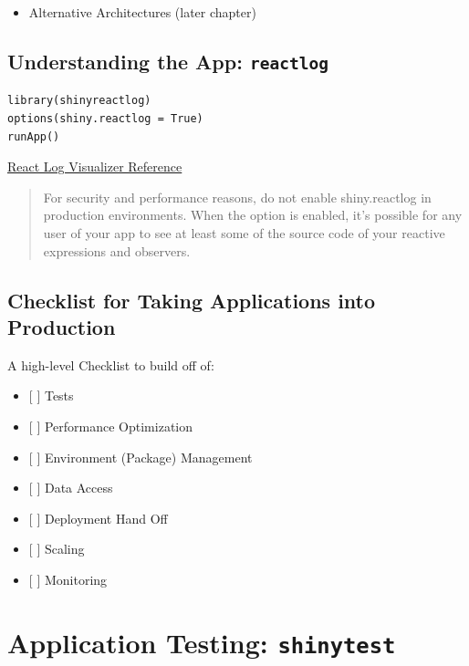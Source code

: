 \documentclass[]{book}
\providecommand{\tightlist}{%
  \setlength{\itemsep}{0pt}\setlength{\parskip}{0pt}}
\begin{document}
\begin{itemize}
\tightlist
\item
  Alternative Architectures (later chapter)
\end{itemize}

\hypertarget{understanding-the-app-reactlog}{%
\section{\texorpdfstring{Understanding the App:
\texttt{reactlog}}{Understanding the App: reactlog}}\label{understanding-the-app-reactlog}}

\begin{verbatim}
library(shinyreactlog)
options(shiny.reactlog = True)
runApp()
\end{verbatim}

\href{https://shiny.rstudio.com/reference/shiny/0.14/showReactLog.html}{React
Log Visualizer Reference}

\begin{quote}
For security and performance reasons, do not enable shiny.reactlog in
production environments. When the option is enabled, it's possible for
any user of your app to see at least some of the source code of your
reactive expressions and observers.
\end{quote}

\hypertarget{checklist-for-taking-applications-into-production}{%
\section{Checklist for Taking Applications into
Production}\label{checklist-for-taking-applications-into-production}}

A high-level Checklist to build off of:

\begin{itemize}
\tightlist
\item
  {[} {]} Tests
\item
  {[} {]} Performance Optimization
\item
  {[} {]} Environment (Package) Management
\item
  {[} {]} Data Access
\item
  {[} {]} Deployment Hand Off
\item
  {[} {]} Scaling
\item
  {[} {]} Monitoring
\end{itemize}

\hypertarget{application-testing-shinytest}{%
\chapter{\texorpdfstring{Application Testing:
\texttt{shinytest}}{Application Testing: shinytest}}\label{application-testing-shinytest}}
\end{document}
